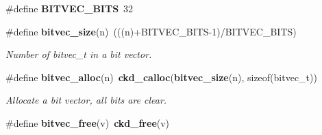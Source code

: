 \begin{DoxyCompactItemize}
\item 
\#define {\bfseries B\+I\+T\+V\+E\+C\+\_\+\+B\+I\+T\+S}~32\label{bitvec_8h_aa992f8d4c7dbe0b71bfd1e01ce279167}

\item 
\#define {\bf bitvec\+\_\+size}(n)~(((n)+B\+I\+T\+V\+E\+C\+\_\+\+B\+I\+T\+S-\/1)/B\+I\+T\+V\+E\+C\+\_\+\+B\+I\+T\+S)\label{bitvec_8h_a1d82193826583f234a71cba32267d3f3}

\begin{DoxyCompactList}\small\item\em Number of bitvec\+\_\+t in a bit vector. \end{DoxyCompactList}\item 
\#define {\bf bitvec\+\_\+alloc}(n)~{\bf ckd\+\_\+calloc}({\bf bitvec\+\_\+size}(n), sizeof(bitvec\+\_\+t))\label{bitvec_8h_a866043a7ac23e137f6c2f2466f4abc70}

\begin{DoxyCompactList}\small\item\em Allocate a bit vector, all bits are clear. \end{DoxyCompactList}\item 
\#define {\bf bitvec\+\_\+free}(v)~{\bf ckd\+\_\+free}(v)\label{bitvec_8h_a5628e35c88ac7e91b99dce916758824a}


\end{DoxyCompactItemize}
